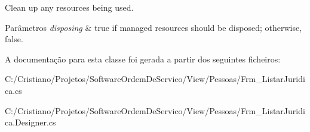 Clean up any resources being used. 


\begin{DoxyParams}{Parâmetros}
{\em disposing} & true if managed resources should be disposed; otherwise, false.\\
\hline
\end{DoxyParams}


A documentação para esta classe foi gerada a partir dos seguintes ficheiros\+:\begin{DoxyCompactItemize}
\item 
C\+:/\+Cristiano/\+Projetos/\+Software\+Ordem\+De\+Servico/\+View/\+Pessoas/Frm\+\_\+\+Listar\+Juridica.\+cs\item 
C\+:/\+Cristiano/\+Projetos/\+Software\+Ordem\+De\+Servico/\+View/\+Pessoas/Frm\+\_\+\+Listar\+Juridica.\+Designer.\+cs\end{DoxyCompactItemize}
